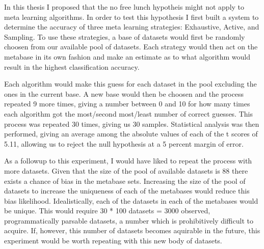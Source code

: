 In this thesis I proposed that the no free lunch hypotheis might not apply to
meta learning algorithms. In order to test this hypothesis I first built a
system to determine the accuracy of three meta learning strategies:
Exhaustive, Active, and Sampling. To use these strategies, a base of
datasets would first be randomly choosen from our available pool of datasets.
Each strategy would then act on the metabase in its own fashion and make an
estimate as to what algorithm would result in the highest classification
accuracy.

Each algorithm would make this guess for each dataset in the pool excluding the
ones in the current base. A new base would then be choosen and the process
repeated 9 more times, giving a number between 0 and 10 for how many times
each algorithm got the most/second most/least number of correct guesses. This
process was repeated 30 times, giving us 30 samples. Statistical analysis was
then performed, giving an average among the absolute values of each of the t
scores of 5.11, allowing us to reject the null hypothesis at a 5 percent margin
of error.

As a followup to this experiment, I would have liked to repeat the process
with more datasets. Given that the size of the pool of available datasets is 88
there exists a chance of bias in the metabase sets. Increasing the size of the
pool of datasets to increase the uniqueness of each of the metabases would reduce
this bias likelihood. Idealistically, each of the datasets in each of the
metabases would be unique. This would require 30 * 100 datasets = 3000 observed,
programmatically parsable datasets, a number which is prohibitively difficult to
acquire. If, however, this number of datasets becomes aquirable in the future,
this experiment would be worth repeating with this new body of datasets.
